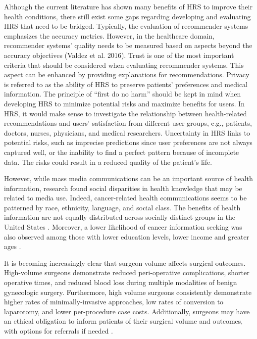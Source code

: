 Although the current literature has shown many benefits of HRS to improve their health conditions, there still exist some gaps regarding developing and evaluating HRS that need to be bridged. Typically, the evaluation of recommender systems emphasizes the accuracy metrics. However, in the healthcare domain, recommender systems' quality needs to be measured based on aspects beyond the accuracy objectives (Valdez et al. 2016). Trust is one of the most important criteria that should be considered when evaluating recommender systems. This aspect can be enhanced by providing explanations for recommendations. Privacy is referred to as the ability of HRS to preserve patients' preferences and medical information. The principle of ``first do no harm'' should be kept in mind when developing HRS to minimize potential risks and maximize benefits for users. In HRS, it would make sense to investigate the relationship between health-related recommendations and users' satisfaction from different user groups, e.g., patients, doctors, nurses, physicians, and medical researchers. Uncertainty in HRS links to potential risks, such as imprecise predictions since user preferences are not always captured well, or the inability to find a perfect pattern because of incomplete data. The risks could result in a reduced quality of the patient's life.

However, while mass media communications can be an important source of health information, research found social disparities in health knowledge that may be related to media use. Indeed, cancer-related health communications seems to be patterned by race, ethnicity, language, and social class. The benefits of health information are not equally distributed across socially distinct groups in the United States \cite{viswanath_race_2011}. Moreover, a lower likelihood of cancer information seeking was also observed among those with lower education levels, lower income and greater ages \cite{finney_rutten_cancer-related_2016}.


It is becoming increasingly clear that surgeon volume affects surgical outcomes. High-volume surgeons demonstrate reduced peri-operative complications, shorter operative times, and reduced blood loss during multiple modalities of benign gynecologic surgery. Furthermore, high volume surgeons consistently demonstrate higher rates of minimally-invasive approaches, low rates of conversion to laparotomy, and lower per-procedure case costs. Additionally, surgeons may have an ethical obligation to inform patients of their surgical volume and outcomes, with options for referrals if needed \cite{glaser_surgeon_2019}.

